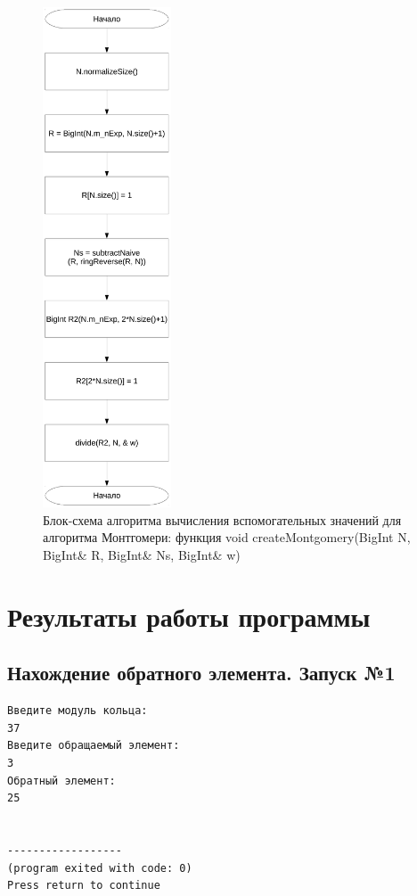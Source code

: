 \documentclass[a4paper,12pt]{article} %
\begin{document}
\begin{figure}[ht]
	\centering
	\includegraphics[width=0.34\textwidth]{lr5_createMontgomery.pdf}
	\caption{
		Блок-схема алгоритма вычисления вспомогательных значений для алгоритма Монтгомери:
		функция void createMontgomery(BigInt N, BigInt\& R, BigInt\& Ns, BigInt\& w)
	}
	\label{bs_lr5_createMontgomery}
\end{figure}


\clearpage

\section*{Результаты работы программы}

\subsection*{Нахождение обратного элемента. Запуск №1}
\begin{verbatim}
Введите модуль кольца:
37
Введите обращаемый элемент:
3
Обратный элемент:
25


------------------
(program exited with code: 0)
Press return to continue
\end{verbatim}
\end{document}
